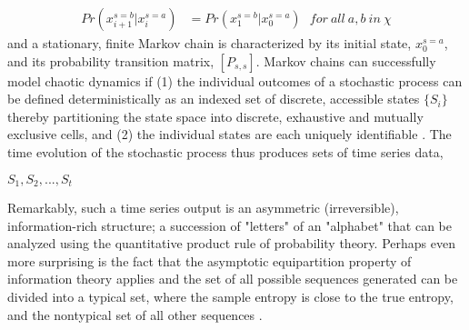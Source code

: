 \documentclass[letter,11pt]{article}
\begin{document}
\begin{align*}
Pr(x^{s=b}_{i+1} | x^{s=a}_{i}) &= Pr(x^{s=b}_{1} | x^{s=a}_{0}) \ \ \  for \ all \ a,b \ in \ \chi
\end{align*}
and a stationary, finite Markov chain is characterized by its initial state, $x^{s=a}_{0}$, and its probability transition matrix, $[P_{s,s}]$. Markov chains can successfully model chaotic dynamics if (1) the individual outcomes of a stochastic process can be defined deterministically as an indexed set of discrete, accessible states $\{  S_{i}\} $ thereby partitioning the state space into discrete, exhaustive and mutually exclusive cells, and (2) the individual states are each uniquely identifiable \cite{nicolis_exploring_1989}. The time evolution of the stochastic process thus produces sets of time series data,
\begin{center}
$ S_{1}, S_{2}, ..., S_{t}$
\end{center}
Remarkably, such a time series output is an asymmetric (irreversible), information-rich structure; a succession of "letters" of an "alphabet" that can be analyzed using the quantitative product rule of probability theory. Perhaps even more surprising is the fact that the asymptotic equipartition property of information theory applies and the set of all possible sequences generated can be divided into a typical set, where the sample entropy is close to the true entropy, and the nontypical set of all other sequences \cite{cover_elements_2006}.\\
\end{document}

